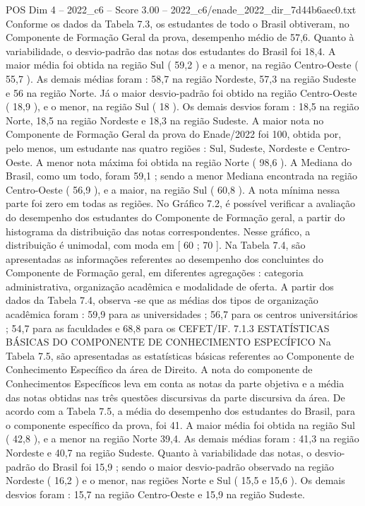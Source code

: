 \begin{textsample}{POS Dim 4 – 2022\_c6 – Score 3.00 – 2022\_c6/enade\_2022\_dir\_7d44b6aec0.txt}
Conforme os dados da Tabela 7.3, os estudantes de todo o Brasil obtiveram, no Componente de Formação Geral da prova, desempenho médio de 57,6.
Quanto à variabilidade, o desvio-padrão das notas dos estudantes do Brasil foi 18,4.
A maior média foi obtida na região Sul ( 59,2 ) e a menor, na região Centro-Oeste ( 55,7 ).
As demais médias foram : 58,7 na região Nordeste, 57,3 na região Sudeste e 56 na região Norte.
Já o maior desvio-padrão foi obtido na região Centro-Oeste ( 18,9 ), e o menor, na região Sul ( 18 ).
Os demais desvios foram : 18,5 na região Norte, 18,5 na região Nordeste e 18,3 na região Sudeste.
A maior nota no Componente de Formação Geral da prova do Enade/2022 foi 100, obtida por, pelo menos, um estudante nas quatro regiões : Sul, Sudeste, Nordeste e Centro-Oeste.
A menor nota máxima foi obtida na região Norte ( 98,6 ).
A Mediana do Brasil, como um todo, foram 59,1 ; sendo a menor Mediana encontrada na região Centro-Oeste ( 56,9 ), e a maior, na região Sul ( 60,8 ).
A nota mínima nessa parte foi zero em todas as regiões.
No Gráfico 7.2, é possível verificar a avaliação do desempenho dos estudantes do Componente de Formação geral, a partir do histograma da distribuição das notas correspondentes.
Nesse gráfico, a distribuição é unimodal, com moda em [ 60 ; 70 ].
Na Tabela 7.4, são apresentadas as informações referentes ao desempenho dos concluintes do Componente de Formação geral, em diferentes agregações : categoria administrativa, organização acadêmica e modalidade de oferta.
A partir dos dados da Tabela 7.4, observa -se que as médias dos tipos de organização acadêmica foram : 59,9 para as universidades ; 56,7 para os centros universitários ; 54,7 para as faculdades e 68,8 para os CEFET/IF. 7.1.3 ESTATÍSTICAS BÁSICAS DO COMPONENTE DE CONHECIMENTO ESPECÍFICO Na Tabela 7.5, são apresentadas as estatísticas básicas referentes ao Componente de Conhecimento Específico da área de Direito.
A nota do componente de Conhecimentos Específicos leva em conta as notas da parte objetiva e a média das notas obtidas nas três questões discursivas da parte discursiva da área.
De acordo com a Tabela 7.5, a média do desempenho dos estudantes do Brasil, para o componente específico da prova, foi 41.
A maior média foi obtida na região Sul ( 42,8 ), e a menor na região Norte 39,4.
As demais médias foram : 41,3 na região Nordeste e 40,7 na região Sudeste.
Quanto à variabilidade das notas, o desvio-padrão do Brasil foi 15,9 ; sendo o maior desvio-padrão observado na região Nordeste ( 16,2 ) e o menor, nas regiões Norte e Sul ( 15,5 e 15,6 ).
Os demais desvios foram : 15,7 na região Centro-Oeste e 15,9 na região Sudeste.

\end{textsample}
